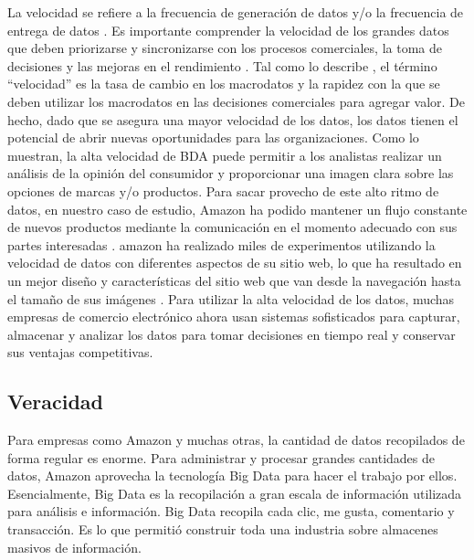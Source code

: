 La velocidad se refiere a la frecuencia de generación de datos y/o la frecuencia de entrega de datos  . Es importante comprender la velocidad de los grandes datos que deben priorizarse y sincronizarse con los procesos comerciales, la toma de decisiones y las mejoras en el rendimiento . Tal como lo describe  , el término ``velocidad'' es la tasa de cambio en los macrodatos y la rapidez con la que se deben utilizar los macrodatos en las decisiones comerciales para agregar valor. De hecho, dado que se asegura una mayor velocidad de los datos, los datos tienen el potencial de abrir nuevas oportunidades para las organizaciones. Como lo muestran, la alta velocidad de BDA puede permitir a los analistas realizar un análisis de la opinión del consumidor y proporcionar una imagen clara sobre las opciones de marcas y/o productos.
Para sacar provecho de este alto ritmo de datos, en nuestro caso de estudio, Amazon ha podido mantener un flujo constante de nuevos productos mediante la comunicación en el momento adecuado con sus partes interesadas . amazon ha realizado miles de experimentos utilizando la velocidad de datos con diferentes aspectos de su sitio web, lo que ha resultado en un mejor diseño y características del sitio web que van desde la navegación hasta el tamaño de sus imágenes . Para utilizar la alta velocidad de los datos, muchas empresas de comercio electrónico ahora usan sistemas sofisticados para capturar, almacenar y analizar los datos para tomar decisiones en tiempo real y conservar sus ventajas competitivas.



\subsection{Veracidad}
Para empresas como Amazon y muchas otras, la cantidad de datos recopilados de forma regular es enorme. Para administrar y procesar grandes cantidades de datos, Amazon aprovecha la tecnología Big Data para hacer el trabajo por ellos. Esencialmente, Big Data es la recopilación a gran escala de información utilizada para análisis e información. Big Data recopila cada clic, me gusta, comentario y transacción. Es lo que permitió construir toda una industria sobre almacenes masivos de información.

